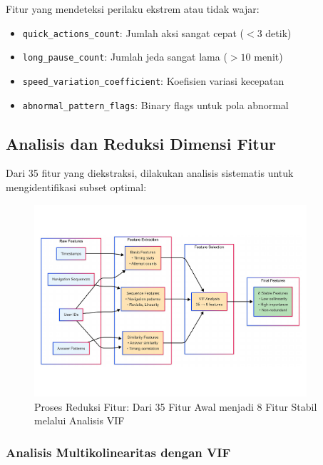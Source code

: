 Fitur yang mendeteksi perilaku ekstrem atau tidak wajar:

\begin{itemize}
    \item \texttt{quick\_actions\_count}: Jumlah aksi sangat cepat ($<3$ detik)
    \item \texttt{long\_pause\_count}: Jumlah jeda sangat lama ($>10$ menit)
    \item \texttt{speed\_variation\_coefficient}: Koefisien variasi kecepatan
    \item \texttt{abnormal\_pattern\_flags}: Binary flags untuk pola abnormal
\end{itemize}

\subsection{Analisis dan Reduksi Dimensi Fitur}
\label{sec:analisisReduksiFitur}

Dari 35 fitur yang diekstraksi, dilakukan analisis sistematis untuk mengidentifikasi subset optimal:

\begin{figure}[htbp]
    \centering
    \includegraphics[width=0.9\textwidth]{figures/feature_engineering_process.pdf}
    \caption{Proses Reduksi Fitur: Dari 35 Fitur Awal menjadi 8 Fitur Stabil melalui Analisis VIF}
    \label{fig:feature_reduction_process}
\end{figure}

\subsubsection{Analisis Multikolinearitas dengan VIF}
\label{sec:analisisVIF}

